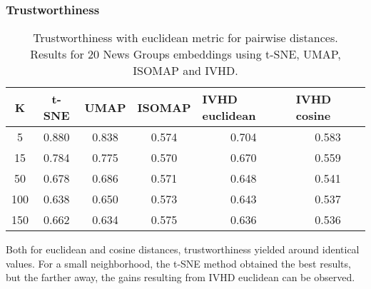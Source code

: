 \documentclass[12pt]{article}
\begin{document}
\subsubsection{Trustworthiness}
\begin{table}[h]
\centering
\caption{Trustworthiness with euclidean metric for pairwise distances. \\
Results for 20 News Groups embeddings using t-SNE, UMAP, ISOMAP and IVHD.}
\begin{tabular}{|c|c|c|c|c|c|}
\hline
\textbf{K} & \textbf{t-SNE} & \textbf{UMAP} & \multicolumn{1}{l|}{\textbf{ISOMAP}} & \multicolumn{1}{l|}{\textbf{IVHD euclidean}} & \multicolumn{1}{l|}{\textbf{IVHD cosine}} \\ \hline
5          & 0.880          & 0.838         & 0.574                                & 0.704                                        & 0.583                                     \\ \hline
15         & 0.784          & 0.775         & 0.570                                & 0.670                                        & 0.559                                     \\ \hline
50         & 0.678          & 0.686         & 0.571                                & 0.648                                        & 0.541                                     \\ \hline
100        & 0.638          & 0.650         & 0.573                                & 0.643                                        & 0.537                                     \\ \hline
150        & 0.662          & 0.634         & 0.575                                & 0.636                                        & 0.536                                     \\ \hline
\end{tabular}
\end{table}
Both for euclidean and cosine distances, trustworthiness yielded around identical values. For a small neighborhood, the t-SNE method obtained the best results, but the farther away, the gains resulting from IVHD euclidean can be observed.
\end{document}
